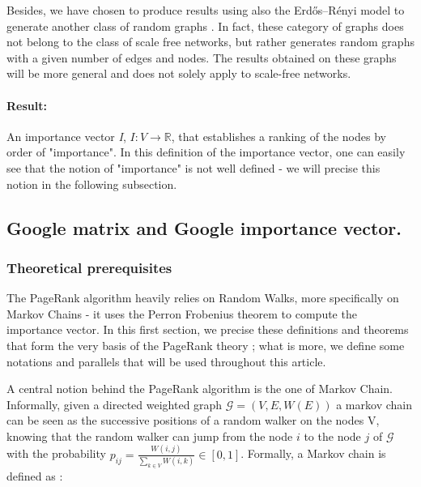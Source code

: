 \documentclass{article}
\begin{document}
Besides, we have chosen to produce results using also the Erdős–Rényi model to generate another class of random graphs \cite{erdos}. In fact, these category of graphs does not belong to the class of scale free networks, but rather generates random graphs with a given number of edges and nodes. The results obtained on these graphs will be more general and does not solely apply to scale-free networks.

\paragraph{Result:} An importance vector \emph{I}, $I:V \rightarrow \mathbb{R}$, that establishes a ranking of the nodes by order of "importance". In this definition of the importance vector, one can easily see that the notion of "importance" is not well defined - we will precise this notion in the following subsection.\\

\subsection{Google matrix and Google importance vector.}

\subsubsection{Theoretical prerequisites}
\label{subsubsec:Theo_prepreq}
The PageRank algorithm heavily relies on Random Walks, more specifically on Markov Chains - it uses the Perron Frobenius theorem to compute the importance vector. In this first section, we precise these definitions and theorems that form the very basis of the PageRank theory ; what is more, we define some notations and parallels that will be used throughout this article.

A central notion behind the PageRank algorithm is the one of Markov Chain. Informally, given a directed weighted graph $\mathcal{G} = (V,E, W(E))$ a markov chain can be seen as the successive positions of a random walker on the nodes V, knowing that the random walker can jump from the node $i$ to the node $j$ of $\mathcal{G}$ with the probability $p_{ij} = \frac{W(i,j)}{\sum_{k\in V} W(i,k)} \in [0,1]$. Formally, a Markov chain is defined as : 
\end{document}
